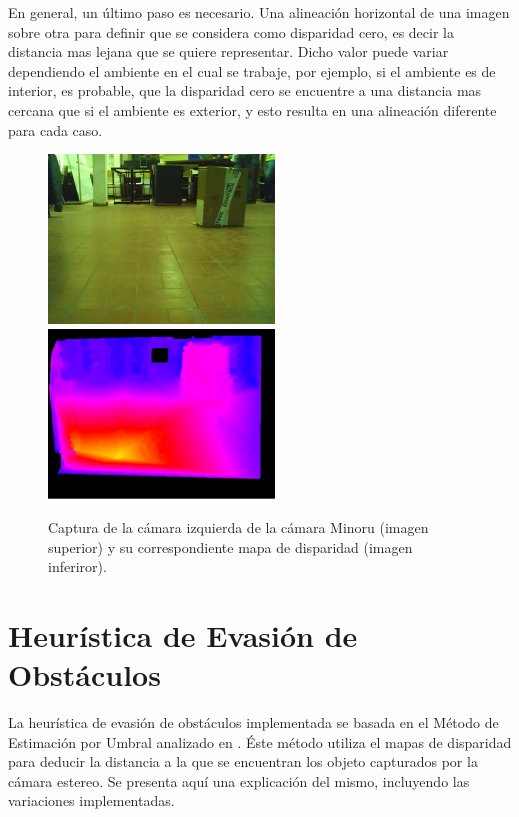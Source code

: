 \documentclass[journal]{IEEEtran}
\begin{document}
En general, un \'ultimo paso es necesario. Una alineaci\'on horizontal de una imagen sobre otra para definir que se considera como disparidad cero, es decir la distancia mas lejana que se quiere representar. Dicho valor puede variar dependiendo el ambiente en el cual se trabaje, por ejemplo, si el ambiente es de interior, es probable, que la disparidad cero se encuentre a una distancia mas cercana que si el ambiente es exterior, y esto resulta en una alineaci\'on diferente para cada caso.


\begin{figure}[ht]
	\begin{center}
		\includegraphics[width=6cm]{./images/original.jpg}
		\includegraphics[width=6cm]{./images/disparidad.jpg}
		\caption{Captura de la c\'amara izquierda de la c\'amara Minoru (imagen superior) y su correspondiente mapa de disparidad (imagen inferiror).}
	\end{center}
\end{figure}

\section{Heur\'istica de Evasi\'on de Obst\'aculos}
\label{sec:heuristica}

La heur\'istica de evasi\'on de obst\'aculos implementada se basada en el M\'etodo de Estimaci\'on por Umbral analizado en \cite{KNG10}. \'Este m\'etodo utiliza el mapas de disparidad para deducir la distancia a la que se encuentran los objeto capturados por la c\'amara estereo. Se presenta aqu\'i una explicaci\'on del mismo, incluyendo las variaciones implementadas.
\end{document}
